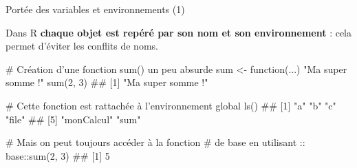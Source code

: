 \documentclass[12pt,ignorenonframetext,]{beamer}
\newenvironment{Shaded}{}{}
\newcommand{\CommentTok}[1]{\textcolor[rgb]{0.00,0.50,0.00}{#1}}
\newcommand{\ControlFlowTok}[1]{\textcolor[rgb]{0.00,0.00,1.00}{#1}}
\newcommand{\DecValTok}[1]{#1}
\newcommand{\KeywordTok}[1]{\textcolor[rgb]{0.00,0.00,1.00}{#1}}
\newcommand{\NormalTok}[1]{#1}
\newcommand{\OperatorTok}[1]{#1}
\newcommand{\StringTok}[1]{\textcolor[rgb]{0.00,0.50,0.50}{#1}}
\renewenvironment{Shaded}{\begin{snugshade}}{\end{snugshade}}
\begin{document}
\begin{frame}[fragile]{\large Portée des variables et environnements
(1)}
\protect\hypertarget{portee-des-variables-et-environnements-1}{}

Dans R \textbf{chaque objet est repéré par son nom et son environnement}
: cela permet d’éviter les conflits de noms.

\pause \footnotesize

\begin{Shaded}
\begin{Highlighting}[]
\CommentTok{# Création d'une fonction sum() un peu absurde}
\NormalTok{sum <-}\StringTok{ }\ControlFlowTok{function}\NormalTok{(...) }\StringTok{"Ma super somme !"}
\KeywordTok{sum}\NormalTok{(}\DecValTok{2}\NormalTok{, }\DecValTok{3}\NormalTok{)}
\NormalTok{  ## [1] "Ma super somme !"}

\CommentTok{# Cette fonction est rattachée à l'environnement global}
\KeywordTok{ls}\NormalTok{()}
\NormalTok{  ## [1] "a"         "b"         "c"         "file"     }
\NormalTok{  ## [5] "monCalcul" "sum"}

\CommentTok{# Mais on peut toujours accéder à la fonction }
\CommentTok{# de base en utilisant ::}
\NormalTok{base}\OperatorTok{::}\KeywordTok{sum}\NormalTok{(}\DecValTok{2}\NormalTok{, }\DecValTok{3}\NormalTok{)}
\NormalTok{  ## [1] 5}
\end{Highlighting}
\end{Shaded}

\end{frame}
\end{document}
